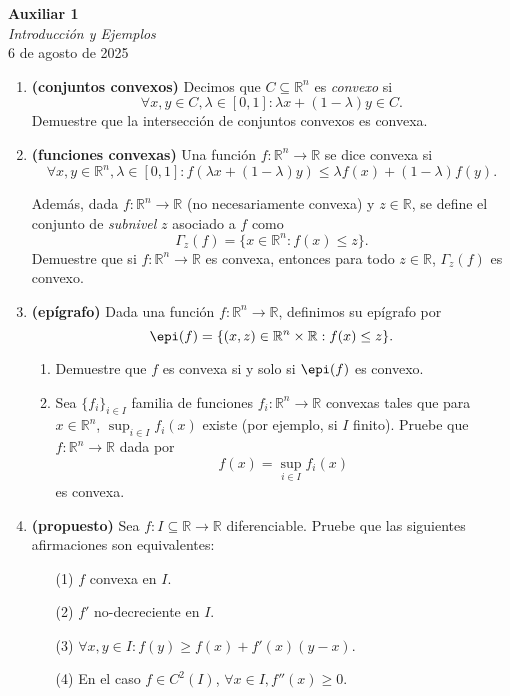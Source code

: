 \documentclass{article}
\begin{document}


\begin{center}
    \Huge{\textbf{Auxiliar 1}}\\
\textit{\large{Introducción y Ejemplos}}\\
    \normalsize
    6 de agosto de 2025
\end{center}

\begin{enumerate}
	\item \textbf{(conjuntos convexos)} Decimos que $C \subseteq \mathbb{R}^n$ es \textit{convexo} si
$$
\forall x, y \in C, \lambda \in [0, 1] : \lambda x + (1 - \lambda)y \in C.
$$
Demuestre que la intersección de conjuntos convexos es convexa.

	\item \textbf{(funciones convexas)} Una función $f : \mathbb{R}^n \to \mathbb{R}$ se dice convexa si
$$
\forall x, y \in \mathbb{R}^n, \lambda \in [0, 1] : f(\lambda x + (1 - \lambda) y) \leq \lambda f(x) + (1 - \lambda)f(y).
$$

Además, dada $f: \mathbb{R}^n \to \mathbb{R}$ (no necesariamente convexa) y $z \in \mathbb{R}$, se define el conjunto de \textit{subnivel} $z$ asociado a $f$ como
$$
\Gamma_z(f) = \{x \in \mathbb{R}^n : f(x) \leq z\}.
$$
Demuestre que si $f : \mathbb{R}^n \to \mathbb{R}$ es convexa, entonces para todo $z \in \mathbb{R}$, $\Gamma_z(f)$ es convexo.

\item \textbf{(epígrafo)} Dada una función $f : \mathbb{R}^n \to \mathbb{R}$, definimos su epígrafo por
$$
\epi(f) = \{ (x, z) \in \mathbb{R}^n \times \mathbb{R} : f(x) \leq z\}.
$$
\begin{enumerate}
	\item Demuestre que $f$ es convexa si y solo si $\epi(f)$ es convexo.
	\item Sea $\{f_i\}_{i \in I}$ familia de funciones $f_i : \mathbb{R}^n \to \mathbb{R}$ convexas tales que para $x \in \mathbb{R}^n$, $\sup_{i \in I} f_i(x)$ existe (por ejemplo, si $I$ finito). Pruebe que $f : \mathbb{R}^n \to \mathbb{R}$ dada por
$$
	f(x) = \sup_{i \in I} f_i(x)
$$
es convexa.

\end{enumerate}

\item \textbf{(propuesto)} Sea $f: I \subseteq \mathbb{R} \to \mathbb{R}$ diferenciable. Pruebe que las siguientes afirmaciones son equivalentes:
\begin{enumerate}
	\item[(1)] $f$ convexa en $I$.
	\item[(2)] $f'$ no-decreciente en $I$.
	\item[(3)] $\forall x, y \in I : f(y) \geq f(x) + f'(x)(y - x)$.
	\item[(4)] En el caso \(f \in C^2(I)\), $\forall x \in I, f''(x) \geq 0$.
\end{enumerate}

\end{enumerate}
\end{document}

